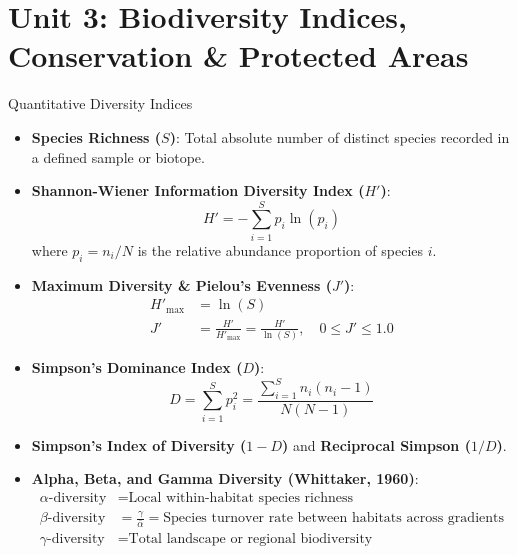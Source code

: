 \chapter{Unit 3: Biodiversity Indices, Conservation \& Protected Areas}

\begin{formulabox}{Quantitative Diversity Indices}
\begin{itemize}[leftmargin=1.2em]
    \item \textbf{Species Richness ($S$)}: Total absolute number of distinct species recorded in a defined sample or biotope.
    \item \textbf{Shannon-Wiener Information Diversity Index ($H'$)}:
    \begin{equation}
    H' = -\sum_{i=1}^S p_i \ln(p_i)
    \end{equation}
    where $p_i = n_i / N$ is the relative abundance proportion of species $i$.
    \item \textbf{Maximum Diversity \& Pielou's Evenness ($J'$)}:
    \begin{align}
    H'_{\text{max}} &= \ln(S) \\
    J' &= \frac{H'}{H'_{\text{max}}} = \frac{H'}{\ln(S)}, \quad 0 \le J' \le 1.0
    \end{align}
    \item \textbf{Simpson's Dominance Index ($D$)}:
    \begin{equation}
    D = \sum_{i=1}^S p_i^2 = \frac{\sum_{i=1}^S n_i(n_i - 1)}{N(N - 1)}
    \end{equation}
    \item \textbf{Simpson's Index of Diversity ($1 - D$)} and \textbf{Reciprocal Simpson ($1/D$)}.
    \item \textbf{Alpha, Beta, and Gamma Diversity (Whittaker, 1960)}:
    \begin{align}
    \alpha\text{-diversity} &= \text{Local within-habitat species richness} \\
    \beta\text{-diversity} &= \frac{\gamma}{\bar{\alpha}} = \text{Species turnover rate between habitats across gradients} \\
    \gamma\text{-diversity} &= \text{Total landscape or regional biodiversity}
    \end{align}
\end{itemize}
\end{formulabox}

